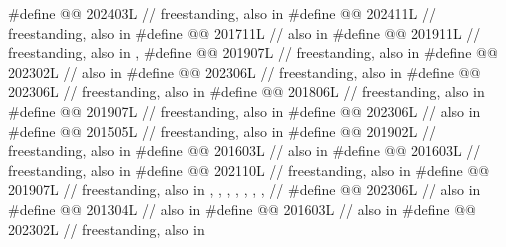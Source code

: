 \begin{codeblock}
#define @@                    202403L // freestanding, also in 
#define @@                        202411L // freestanding, also in 
#define @@                 201711L // also in 
#define @@       201911L // freestanding, also in , 
#define @@                       201907L // freestanding, also in 
#define @@                           202302L // also in 
#define @@                         202306L // freestanding, also in 
#define @@                        202306L // freestanding, also in 
#define @@                          201806L // freestanding, also in 
#define @@                            201907L // freestanding, also in 
#define @@                            202306L // also in 
#define @@                     201505L // freestanding, also in 
#define @@              201902L // freestanding, also in 
#define @@              201603L // also in 
#define @@                              201603L // freestanding, also in 
#define @@                          202110L // freestanding, also in 
#define @@                           201907L
  // freestanding, also in , , , , , , ,
  // 
#define @@                            202306L // also in 
#define @@                       201304L // also in 
#define @@                             201603L // also in 
#define @@                  202302L // freestanding, also in 

\end{codeblock}
